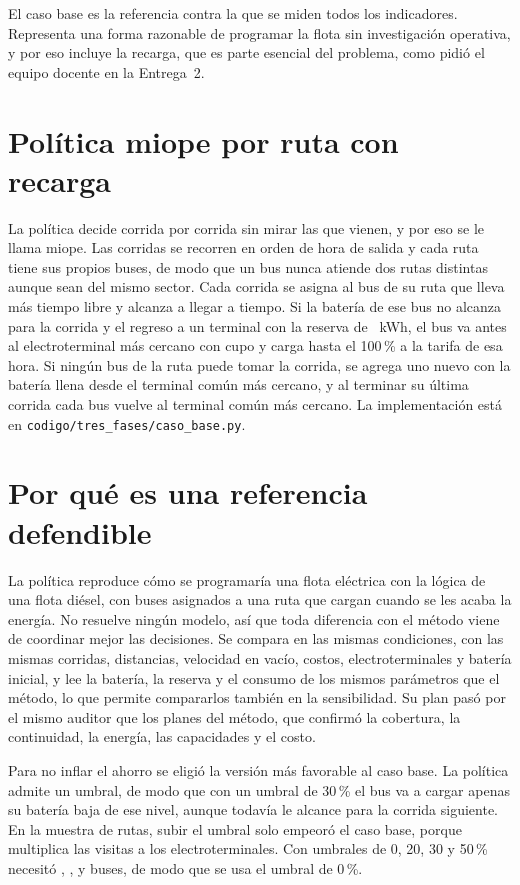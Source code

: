 
El caso base es la referencia contra la que se miden todos los indicadores. Representa una forma razonable de programar la flota sin investigación operativa, y por eso incluye la recarga, que es parte esencial del problema, como pidió el equipo docente en la Entrega~2.

\section{Política miope por ruta con recarga}
\label{sec:politica-miope}

La política decide corrida por corrida sin mirar las que vienen, y por eso se le llama miope. Las corridas se recorren en orden de hora de salida y cada ruta tiene sus propios buses, de modo que un bus nunca atiende dos rutas distintas aunque sean del mismo sector. Cada corrida se asigna al bus de su ruta que lleva más tiempo libre y alcanza a llegar a tiempo. Si la batería de ese bus no alcanza para la corrida y el regreso a un terminal con la reserva de \Reserva~kWh, el bus va antes al electroterminal más cercano con cupo y carga hasta el 100\,\% a la tarifa de esa hora. Si ningún bus de la ruta puede tomar la corrida, se agrega uno nuevo con la batería llena desde el terminal común más cercano, y al terminar su última corrida cada bus vuelve al terminal común más cercano. La implementación está en \texttt{codigo/tres\_fases/caso\_base.py}.

\section{Por qué es una referencia defendible}
\label{sec:caso-base-defendible}

La política reproduce cómo se programaría una flota eléctrica con la lógica de una flota diésel, con buses asignados a una ruta que cargan cuando se les acaba la energía. No resuelve ningún modelo, así que toda diferencia con el método viene de coordinar mejor las decisiones. Se compara en las mismas condiciones, con las mismas corridas, distancias, velocidad en vacío, costos, electroterminales y batería inicial, y lee la batería, la reserva y el consumo de los mismos parámetros que el método, lo que permite compararlos también en la sensibilidad. Su plan pasó por el mismo auditor que los planes del método, que confirmó la cobertura, la continuidad, la energía, las capacidades y el costo.

Para no inflar el ahorro se eligió la versión más favorable al caso base. La política admite un umbral, de modo que con un umbral de 30\,\% el bus va a cargar apenas su batería baja de ese nivel, aunque todavía le alcance para la corrida siguiente. En la muestra de \EdosRutasMuestra{} rutas, subir el umbral solo empeoró el caso base, porque multiplica las visitas a los electroterminales. Con umbrales de 0, 20, 30 y 50\,\% necesitó \EdosBusesBase, \EdosBusesUmbralVeinte, \EdosBusesUmbralTreinta{} y \EdosBusesUmbralCincuenta{} buses, de modo que se usa el umbral de 0\,\%.

